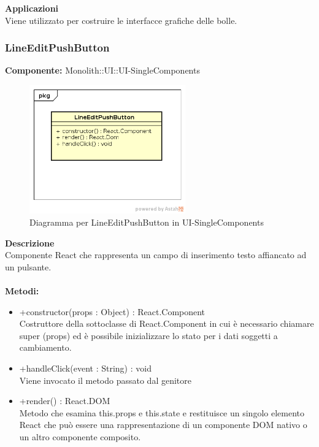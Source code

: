 \textbf{Applicazioni}\\
Viene utilizzato per costruire le interfacce grafiche delle bolle. 


\clearpage

\subsubsection{LineEditPushButton}
\textbf{Componente:}  Monolith::UI::UI-SingleComponents\\
   \FloatBarrier
   \begin{figure}[ht]
   \centering
   \includegraphics[width=0.6\textwidth]{img/single-LineEditPushButton}
   \caption{{Diagramma per LineEditPushButton in UI-SingleComponents}}
\end{figure}
\FloatBarrier
\textbf{Descrizione}\\
Componente React che rappresenta un campo di inserimento testo affiancato ad un pulsante. \\\\
\textbf{Metodi:} \begin{itemize}\item +constructor(props : Object) : React.Component \\Costruttore della sottoclasse di React.Component in cui è necessario chiamare super (props) ed è possibile inizializzare lo stato per i dati soggetti a cambiamento.\item +handleClick(event : String) : void  \\Viene invocato il metodo passato dal genitore\item +render() : React.DOM \\Metodo che esamina this.props e this.state e restituisce un singolo elemento React che può essere una rappresentazione di un componente DOM nativo o un altro componente composito.\end{itemize} 


